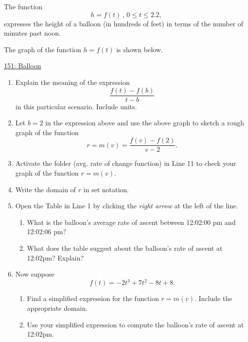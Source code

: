 \documentclass{ximera}
\begin{document}
\begin{question}  \label{Q4ghg5t4t4tr4}
The function
\[
      h = f(t)  \, , \, 0\leq t \leq 2.2 ,                     %
\]
expresses the height of a balloon (in hundreds of feet) in terms of the number of minutes past noon.

The graph of the function $h=f(t)$ is shown below.

\begin{onlineOnly}
    \begin{center}
\end{center}
\end{onlineOnly}

\href{https://www.desmos.com/calculator/kovtjpsebu}{151: Balloon}

\begin{enumerate}

\item Explain the meaning of the expression
\[
     \frac{f(t)-f(b)}{t-b}
\]
in this particular scenario. Include units.

\item Let $b=2$ in the expression above and use the above graph to sketch a rough graph of the function
\[
         r = m(v) = \frac{f(v)-f(2)}{v-2} .
\]

\item Activate the folder (avg. rate of change function) in Line 11 to check your graph of the function $r=m(v)$. 

\item Write the domain of $r$ in set notation.

\item Open the Table in Line 1 by clicking the \emph{right arrow} at the left of the line. 

\begin{enumerate}
\item What is the balloon's average rate of ascent between 12:02:00 pm and 12:02:06 pm?

\item What does the table suggest about the balloon's rate of ascent at 12:02pm? Explain?
\end{enumerate}

\item Now suppose
\[
   f(t) = -2t^3+7t^2-8t+8 .
\]

\begin{enumerate}
\item Find a simplified expression for the function $r=m(v)$. Include the appropriate domain.

\item Use your simplified expression to compute the balloon's rate of ascent at 12:02pm.
\end{enumerate}



\end{enumerate}

\end{question}
\end{document}
